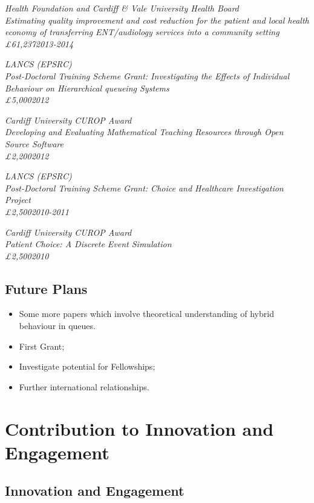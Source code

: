\documentclass{article}
\begin{document}
\sl{Health Foundation and Cardiff \& Vale University Health Board}\\
Estimating quality improvement and cost reduction for the patient and local health economy of transferring ENT/audiology services into a community setting\\
\pounds61,237\hfill{2013-2014}


\sl{LANCS (EPSRC)}\\
Post-Doctoral Training Scheme Grant: Investigating the Effects of Individual Behaviour on Hierarchical queueing Systems\\
\pounds5,000\hfill{2012}


\sl{Cardiff University CUROP Award}\\
Developing and Evaluating Mathematical Teaching Resources through Open Source Software\\
\pounds2,200\hfill{2012}

\sl{LANCS (EPSRC)}\\
Post-Doctoral Training Scheme Grant: Choice and Healthcare Investigation Project\\
\pounds2,500\hfill{2010-2011}

\sl{Cardiff University CUROP Award}\\
Patient Choice: A Discrete Event Simulation\\
\pounds2,500\hfill{2010}

\subsection{Future Plans}

\begin{itemize}
    \item Some more papers which involve theoretical understanding of hybrid behaviour in queues.
    \item First Grant;
    \item Investigate potential for Fellowships;
    \item Further international relationships.
\end{itemize}

\section{Contribution to Innovation and Engagement}\label{sec:innovation}

\subsection{Innovation and Engagement}
\end{document}
